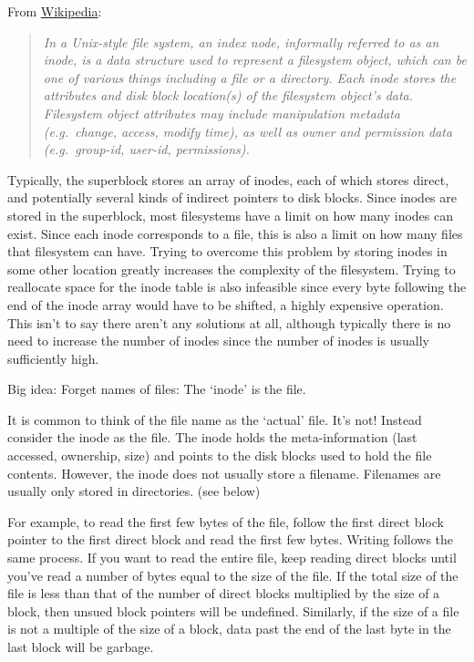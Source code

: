 From \href{http://en.wikipedia.org/wiki/Inode}{Wikipedia}:

\begin{quote}
\emph{In a Unix-style file system, an index node, informally referred to as an inode, is a data structure used to represent a filesystem object, which can be one of various things including a file or a directory. Each inode stores the attributes and disk block location(s) of the filesystem object's data. Filesystem object attributes may include manipulation metadata (e.g.~change, access, modify time), as well as owner and permission data (e.g.~group-id, user-id, permissions).}
\end{quote}

Typically, the superblock stores an array of inodes, each of which stores direct, and potentially several kinds of indirect pointers to disk blocks. Since inodes are stored in the superblock, most filesystems have a limit on how many inodes can exist. Since each inode corresponds to a file, this is also a limit on how many files that filesystem can have. Trying to overcome this problem by storing inodes in some other location greatly increases the complexity of the filesystem. Trying to reallocate space for the inode table is also infeasible since every byte following the end of the inode array would have to be shifted, a highly expensive operation. This isn't to say there aren't any solutions at all, although typically there is no need to increase the number of inodes since the number of inodes is usually sufficiently high.

Big idea: Forget names of files: The `inode' is the file.

It is common to think of the file name as the `actual' file. It's not! Instead consider the inode as the file. The inode holds the meta-information (last accessed, ownership, size) and points to the disk blocks used to hold the file contents. However, the inode does not usually store a filename. Filenames are usually only stored in directories. (see below)

For example, to read the first few bytes of the file, follow the first direct block pointer to the first direct block and read the first few bytes. Writing follows the same process. If you want to read the entire file, keep reading direct blocks until you've read a number of bytes equal to the size of the file. If the total size of the file is less than that of the number of direct blocks multiplied by the size of a block, then unsued block pointers will be undefined. Similarly, if the size of a file is not a multiple of the size of a block, data past the end of the last byte in the last block will be garbage.

